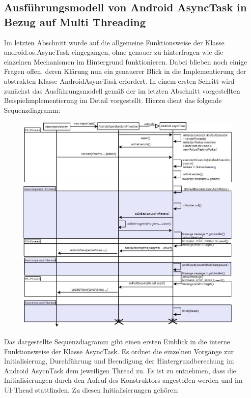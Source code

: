 \documentclass[12pt,oneside,a4paper,bibtotoc,liststotoc]{scrreprt}
\begin{document}
\subsection{Ausführungsmodell von Android AsyncTask in Bezug auf Multi Threading}
Im letzten Abschnitt wurde auf die allgemeine Funktionsweise der Klasse android.os.AsyncTask eingegangen, ohne genauer zu hinterfragen wie die einzelnen Mechanismen im Hintergrund funktionieren. Dabei blieben noch einige Fragen offen, deren Klärung nun ein genauerer Blick in die Implementierung der abstrakten Klasse AndroidAsyncTask erfordert. In einem ersten Schritt wird zunächst das Ausführungsmodell gemäß der im letzten Abschnitt vorgestellten Beispielimplementierung im Detail vorgestellt. Hierzu dient das folgende Sequenzdiagramm:
\begin{figure}[H]
  \begin{centering}
    \includegraphics[height=1\textwidth]{img/asyncTask_seqenzdiagramm.png}
    \label{asyncTask_seqenzdiagramm}
  \end{centering}
\end{figure}
Das dargestellte Sequenzdiagramm gibt einen ersten Einblick in die interne Funktionsweise der Klasse AsyncTask. Es ordnet die einzelnen Vorgänge zur Initialisierung, Durchführung und Beendigung der Hintergrundberechung im Android AsycnTask dem jeweiligen Thread zu.  Es ist zu entnehmen, dass die Initialisierungen durch den Aufruf des Konstruktors angestoßen werden und im UI-Thead stattfinden. Zu diesen Initialisierungen gehören:\newline
\end{document}
